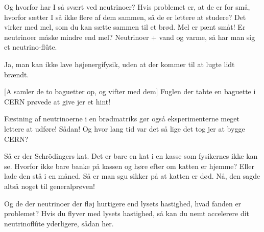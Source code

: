 \documentclass[a4paper,11pt]{article}
\begin{document}
\begin{sketch}
 Og hvorfor har I så svært ved neutrinoer?  Hvis problemet er,
at de er for små, hvorfor sætter I så ikke flere af dem sammen, så de
er lettere at studere? Det virker med mel, som du kan sætte sammen til
et brød. Mel er pænt småt! Er neutrinoer måske mindre end mel?
Neutrinoer + vand og varme, så har man sig et neutrino-flûte.


 Ja, man kan ikke lave højenergifysik, uden at der kommer
til at lugte lidt brændt.

[A samler de to baguetter op, og vifter med dem] Fuglen der
tabte en baguette i CERN prøvede at give jer et hint!

 Fæstning af neutrinoerne i en brødmatriks gør også
eksperimenterne meget lettere at udføre!  Sådan!
Og hvor lang tid var det så lige det tog jer at bygge CERN?

 Så er der Schrödingers kat. Det er bare en kat i en kasse som
fysikernes ikke kan se. Hvorfor ikke bare banke på kassen og høre
efter om katten er hjemme? Eller lade den stå i en måned. Så er man sgu sikker på at
katten er død.  Nå, den sagde
altså noget til generalprøven!

 Og de der neutrinoer der fløj hurtigere end lysets hastighed,
hvad fanden er problemet?  Hvis du flyver med lysets hastighed, så kan
du nemt accelerere dit neutrinoflûte yderligere, sådan her.


\end{sketch}
\end{document}
